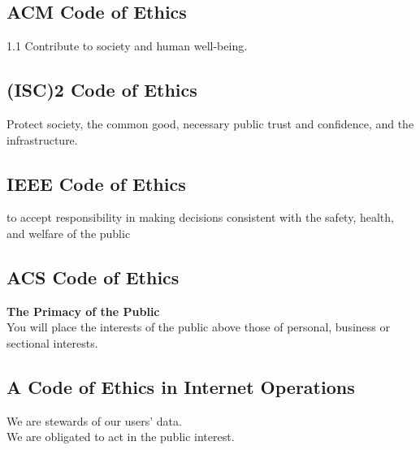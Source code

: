 \documentclass[xga]{xdvislides}
\begin{document}
\subsection{ACM Code of Ethics}
\Huge
\vspace*{\fill}
\begin{center}
1.1 Contribute to society and human well-being.
\end{center}
\vspace*{\fill}
\Normalsize

\subsection{(ISC)2 Code of Ethics}
\Huge
\vspace*{\fill}
\begin{center}
Protect society, the common good, necessary public
trust and confidence, and the infrastructure.
\end{center}
\vspace*{\fill}
\Normalsize

\subsection{IEEE Code of Ethics}
\Huge
\vspace*{\fill}
\begin{center}
to accept responsibility in making decisions
consistent with the safety, health, and welfare of the
public
\end{center}
\vspace*{\fill}
\Normalsize

\subsection{ACS Code of Ethics}
\Huge
\vspace*{\fill}
\begin{center}

{\bf The Primacy of the Public} \\
You will place the interests of the public
above those of personal, business or sectional
interests.

\end{center}
\vspace*{\fill}
\Normalsize

\subsection{A Code of Ethics in Internet Operations}
\Huge
\vspace*{\fill}
\begin{center}

We are stewards of our users' data. \\

We are obligated to act in the public interest.

\end{center}
\vspace*{\fill}
\Normalsize
\end{document}
